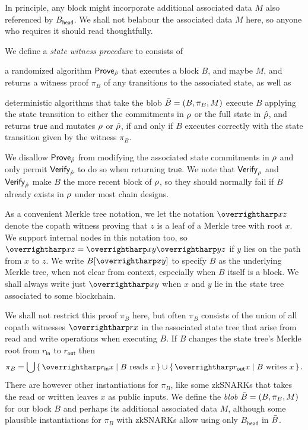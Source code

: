 In principle, any block might incorporate additional associated data $M$ also referenced by $B_{\mathsf{head}}$.  We shall not belabour the associated data $M$ here, so anyone who requires it should read thoughtfully.

\begin{definition}\label{def:pob}
We define a {\em state witness procedure} to consists of
\item a randomized algorithm $\mathsf{Prove}_{\hat{\rho}}$ that executes a block $B$, and maybe $M$, and returns a witness proof $\pi_B$ of any transitions to the associated state, as well as 
\item deterministic algorithms  that take the blob $\bar{B} = (B,\pi_B,M)$ execute $B$ applying the state transition to either the commitments in $\rho$ or the full state in $\hat{\rho}$, and returns $\mathsf{true}$ and mutates $\rho$ or $\hat{\rho}$, if and only if $B$ executes correctly with the state transition given by the witness $\pi_B$. 
\end{definition}
We disallow $\mathsf{Prove}_{\hat{\rho}}$ from modifying the associated state commitments in $\rho$ and only permit $\mathsf{Verify}_{\hat{\rho}}$ to do so when returning $\mathsf{true}$.  We note that $\mathsf{Verify}_{\rho}$ and $\mathsf{Verify}_{\hat{\rho}}$ make $B$ the more recent block of $\rho$, so they should normally fail if $B$ already exists in $\rho$ under most chain designs. 

As a convenient Merkle tree notation, we let the notation $\vect{xz}$ denote the copath witness proving that $z$ is a leaf of a Merkle tree with root $x$.  We support internal nodes in this notation too, so $\vect{xz} = \vect{xy} \vect{yz}$ if $y$ lies on the path from $x$ to $z$.  We write $B[\vect{xy}]$ to specify $B$ as the underlying Merkle tree, when not clear from context, especially when $B$ itself is a block.  We shall always write just $\vect{xy}$ when $x$ and $y$ lie in the state tree associated to some blockchain.  

\newcommand\rin{\ensuremath{r_{\mathsf{in}}}} %
\newcommand\rout{\ensuremath{r_{\mathsf{out}}}} %
We shall not restrict this proof $\pi_B$ here, but often $\pi_B$ consists of the union of all copath witnesses $\vect{rx}$ in the associated state tree that arise from read and write operations when executing $B$.  If $B$ changes the state tree's Merkle root from $\rin$ to $\rout$ then 
$$
\pi_B = 
  \bigcup \Setst{ \vect{\rin x} }{ \textrm{$B$ reads $x$} }
  \cup \Setst{ \vect{\rout x} }{ \textrm{$B$ writes $x$} } \mathperiod
$$
There are however other instantiations for $\pi_B$, like some zkSNARKs that takes the read or written leaves $x$ as public inputs.  We define the {\em blob} $\bar{B} = (B, \pi_B, M)$ for our block $B$ and perhaps its additional associated data $M$, although some plausible instantiations for $\pi_B$ with zkSNARKs allow using only $B_{\mathsf{head}}$ in $\bar{B}$.

